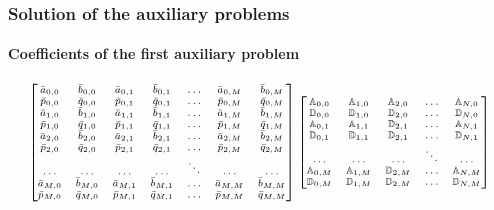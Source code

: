 \documentclass{beamer}
\begin{document}
\begin{frame}
	\frametitle{Solution of the auxiliary problems}
	\framesubtitle{Coefficients of the first auxiliary problem}
	\begin{align*}
	\scriptsize \begin{bmatrix}
	\bar{a}_{0,0} & \bar{b}_{0,0} & \bar{a}_{0,1} & \bar{b}_{0,1} &  \ldots & \bar{a}_{0,M} & \bar{b}_{0,M} \\
	\bar{p}_{0,0} & \bar{q}_{0,0} & \bar{p}_{0,1} & \bar{q}_{0,1} &  \ldots & \bar{p}_{0,M} & \bar{q}_{0,M} \\
	\bar{a}_{1,0} & \bar{b}_{1,0} & \bar{a}_{1,1} & \bar{b}_{1,1} &  \ldots & \bar{a}_{1,M} & \bar{b}_{1,M} \\
	\bar{p}_{1,0} & \bar{q}_{1,0} & \bar{p}_{1,1} & \bar{q}_{1,1} &  \ldots & \bar{p}_{1,M} & \bar{q}_{1,M} \\
	\bar{a}_{2,0} & \bar{b}_{2,0} & \bar{a}_{2,1} & \bar{b}_{2,1} &  \ldots & \bar{a}_{2,M} & \bar{b}_{2,M} \\
	\bar{p}_{2,0} & \bar{q}_{2,0} & \bar{p}_{2,1} & \bar{q}_{2,1} &  \ldots & \bar{p}_{2,M} & \bar{q}_{2,M} \\
	\ldots & \ldots & \ldots & \ldots & \ddots & \ldots & \ldots\\
	\bar{a}_{M,0} & \bar{b}_{M,0} & \bar{a}_{M,1} & \bar{b}_{M,1} &  \ldots & \bar{a}_{M,M} & \bar{b}_{M,M} \\
	\bar{p}_{M,0} & \bar{q}_{M,0} & \bar{p}_{M,1} & \bar{q}_{M,1} &  \ldots & \bar{p}_{M,M} & \bar{q}_{M,M}
	\end{bmatrix}
	\begin{bmatrix}
	\mathbb{A}_{0,0} & \mathbb{A}_{1,0} & \mathbb{A}_{2,0} & \ldots & \mathbb{A}_{N,0} \\
	\mathbb{D}_{0,0} & \mathbb{D}_{1,0} & \mathbb{D}_{2,0} & \ldots & \mathbb{D}_{N,0} \\
	\mathbb{A}_{0,1} & \mathbb{A}_{1,1} & \mathbb{D}_{2,1} & \ldots & \mathbb{A}_{N,1} \\
	\mathbb{D}_{0,1} & \mathbb{D}_{1,1} & \mathbb{D}_{2,1} & \ldots & \mathbb{D}_{N,1} \\
	\ldots & \ldots & \ldots & \ddots & \ldots \\
	\mathbb{A}_{0,M} & \mathbb{A}_{1,M} & \mathbb{D}_{2,M} & \ldots & \mathbb{A}_{N,M} \\
	\mathbb{D}_{0,M} & \mathbb{D}_{1,M} & \mathbb{D}_{2,M} & \ldots & \mathbb{D}_{N,M}
	\end{bmatrix}
	\end{align*}
	

\end{frame}
\end{document}
